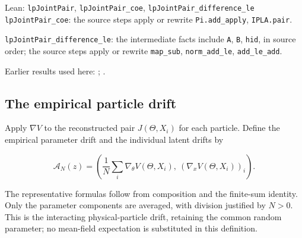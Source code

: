 \documentclass[11pt,a4paper]{report}
\begin{document}
\begin{leanbox}{Lean: \texttt{lpJointPair}, \texttt{lpJointPair\_\allowbreak{}coe}, \texttt{lpJointPair\_\allowbreak{}difference\_\allowbreak{}le}}
\texttt{lp\allowbreak{}Joint\allowbreak{}Pair\_\allowbreak{}coe}: the source steps apply or rewrite \texttt{Pi.\allowbreak{}add\_\allowbreak{}apply}, \texttt{IPLA.\allowbreak{}pair}.



\texttt{lp\allowbreak{}Joint\allowbreak{}Pair\_\allowbreak{}difference\_\allowbreak{}le}: the intermediate facts include \texttt{A}, \texttt{B}, \texttt{hid}, in source order; the source steps apply or rewrite \texttt{map\_\allowbreak{}sub}, \texttt{norm\_\allowbreak{}add\_\allowbreak{}le}, \texttt{add\_\allowbreak{}le\_\allowbreak{}add}.
\end{leanbox}


Earlier results used here: \cite[Section~3.1.1]{LangevinLean2026IPLA}; \cite[Section~3.3.1]{LangevinLean2026IPLA}.
\subsection{\texorpdfstring{The empirical particle drift}{The empirical particle drift}}
\label{report-step-ProximalLangevin-MeanFieldParticleDrift-lean-3}


Apply \(\nabla V\) to the reconstructed pair \(J(\Theta,X_i)\) for each particle. Define the empirical parameter drift and the individual latent drifts by

\[\mathcal A_N(z)=\left(\frac1N\sum_i\nabla_\theta V(\Theta,X_i),\ (\nabla_xV(\Theta,X_i))_i\right).\]

The representative formulas follow from composition and the finite-sum identity. Only the parameter components are averaged, with division justified by \(N>0\). This is the interacting physical-particle drift, retaining the common random parameter; no mean-field expectation is substituted in this definition.
\end{document}
